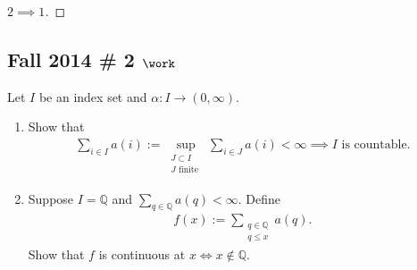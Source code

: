 \begin{solution}
\begin{proof}[$2\implies 1$]
\end{proof}

\end{solution}

\hypertarget{fall-2014-2-work}{%
\subsection{\texorpdfstring{Fall 2014 \# 2
\(\work\)}{Fall 2014 \# 2 \textbackslash work}}\label{fall-2014-2-work}}

Let \(I\) be an index set and \(\alpha: I \to (0, \infty)\).

\begin{enumerate}
\def\labelenumi{\alph{enumi}.}
\item
  Show that
  \begin{align*}
  \sum_{i \in I} a(i):=\sup _{\substack{ J \subset I \\ J \text { finite }}} \sum_{i \in J} a(i)<\infty \implies I \text{ is countable.}
  \end{align*}
\item
  Suppose \(I = {\mathbb{Q}}\) and
  \(\sum_{q \in \mathbb{Q}} a(q)<\infty\). Define
  \begin{align*}
  f(x):=\sum_{\substack{q \in \mathbb{Q}\\ q \leq x}} a(q).
  \end{align*}
  Show that \(f\) is continuous at \(x \iff x\not\in {\mathbb{Q}}\).
\end{enumerate}


